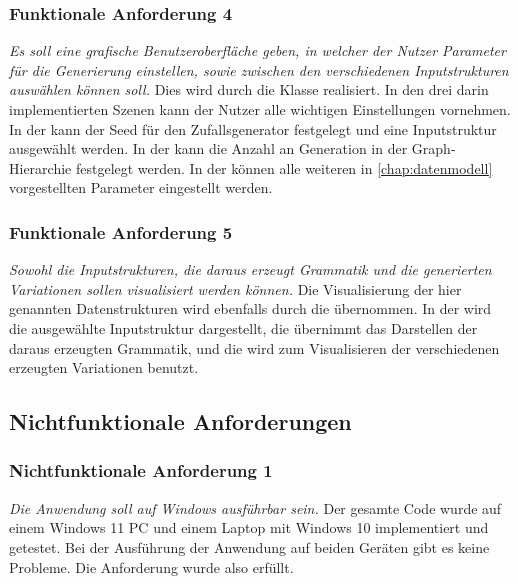 \subsubsection{Funktionale Anforderung 4}
\textit{Es soll eine grafische Benutzeroberfläche geben, in welcher der Nutzer Parameter für die Generierung einstellen, sowie zwischen
den verschiedenen Inputstrukturen auswählen können soll.} Dies wird durch die Klasse  realisiert. In den drei darin
implementierten Szenen kann der Nutzer alle wichtigen Einstellungen vornehmen. In der  kann der Seed für den Zufallsgenerator festgelegt
und eine Inputstruktur ausgewählt werden. In der  kann die Anzahl an Generation in der Graph-Hierarchie festgelegt werden. In der
 können alle weiteren in \autoref{chap:datenmodell} vorgestellten Parameter eingestellt werden.

\subsubsection{Funktionale Anforderung 5}
\textit{Sowohl die Inputstrukturen, die daraus erzeugt Grammatik und die generierten Variationen sollen visualisiert werden können.} Die Visualisierung
der hier genannten Datenstrukturen wird ebenfalls durch die  übernommen. In der  wird die ausgewählte
Inputstruktur dargestellt, die  übernimmt das Darstellen der daraus erzeugten Grammatik, und die  wird zum
Visualisieren der verschiedenen erzeugten Variationen benutzt.

\subsection{Nichtfunktionale Anforderungen}
\subsubsection{Nichtfunktionale Anforderung 1}
\textit{Die Anwendung soll auf Windows ausführbar sein.} Der gesamte Code wurde auf einem Windows 11 PC und einem Laptop mit Windows 10 implementiert
und getestet. Bei der Ausführung der Anwendung auf beiden Geräten gibt es keine Probleme. Die Anforderung wurde also erfüllt.

